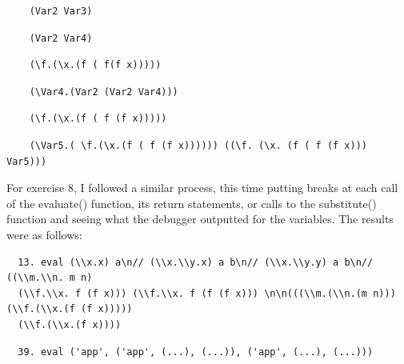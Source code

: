 \documentclass{article}
\theoremstyle{theorem}
\theoremstyle{definition}
\theoremstyle{remark}
\begin{document}
   \begin{verbatim}
    (Var2 Var3)
   \end{verbatim}

   \begin{verbatim}
    (Var2 Var4)
   \end{verbatim}

   \begin{verbatim}
    (\f.(\x.(f ( f(f x)))))
   \end{verbatim}

   \begin{verbatim}
    (\Var4.(Var2 (Var2 Var4)))
   \end{verbatim}

   \begin{verbatim}
    (\f.(\x.(f ( f (f x)))))
   \end{verbatim}
  
   \begin{verbatim}
    (\Var5.( \f.(\x.(f ( f (f x)))))) ((\f. (\x. (f ( f (f x))) Var5)))
   \end{verbatim}

\hspace{0.65cm}For exercise 8, I followed a similar process, this time putting breaks at each call of the evaluate() function, its return statements, or calls to the substitute() function and seeing what the debugger outputted for the variables. The results were as follows: \\

\begin{verbatim}
  13. eval (\\x.x) a\n// (\\x.\\y.x) a b\n// (\\x.\\y.y) a b\n// ((\\m.\\n. m n) 
  (\\f.\\x. f (f x))) (\\f.\\x. f (f (f x))) \n\n(((\\m.(\\n.(m n))) (\\f.(\\x.(f (f x))))) 
  (\\f.(\\x.(f x))))
 \end{verbatim}

\begin{verbatim}
  39. eval ('app', ('app', (...), (...)), ('app', (...), (...)))
\end{verbatim}
\end{document}

